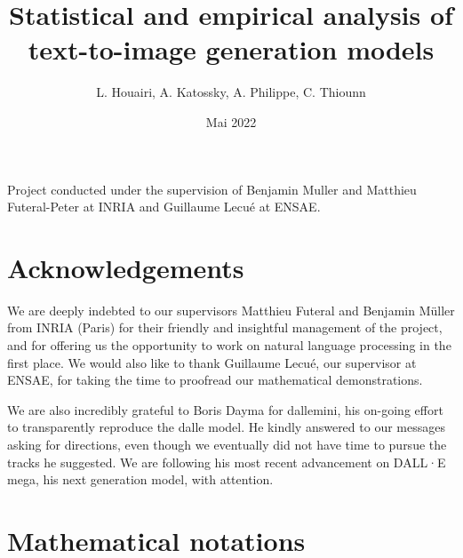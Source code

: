 \documentclass{article}
\title{Statistical and empirical analysis of text-to-image generation models}
\author{L. Houairi,
A. Katossky,
A. Philippe,
C. Thiounn }
\date{Mai 2022}
\begin{document}
\begin{titlepage}
\maketitle

Project conducted under the supervision of Benjamin Muller and Matthieu Futeral-Peter at INRIA and Guillaume Lecué at ENSAE.
\end{titlepage}

\renewcommand*\contentsname{Table of Contents}
\tableofcontents

\setlength\parskip{0.2 em} %

\pagebreak
{} %
\section*{Acknowledgements} 

\begin{multicols}{2}

We are deeply indebted to our supervisors Matthieu Futeral and Benjamin Müller from INRIA (Paris) for their friendly and insightful management of the project, and for offering us the opportunity to work on natural language processing in the first place. We would also like to thank Guillaume Lecué, our supervisor at ENSAE, for taking the time to proofread our mathematical demonstrations.

We are also incredibly grateful to Boris Dayma for \gls{dallemini}, his on-going effort to transparently reproduce the \gls{dalle} model. He kindly answered to our messages asking for directions, even though we eventually did not have time to pursue the tracks he suggested. We are following his most recent advancement on DALL·E mega, his next generation model, with attention.

\end{multicols}

\pagebreak

\printglossary[title=Glossary and abbreviations]

\clearpage

\pagebreak
{}
{}
\section*{Mathematical notations}
\end{document}
